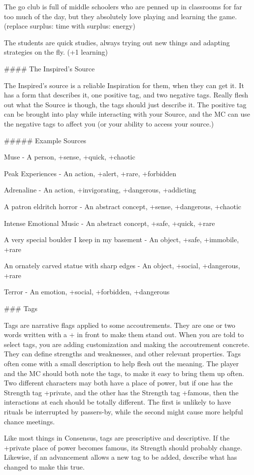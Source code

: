 \documentclass[
  oneside,
  statementpaper,
  9pt]{memoir}
\begin{document}
\begin{Player}
The go club is full of middle schoolers who are penned up in classrooms for far too much of the day, but they absolutely love playing and learning the game. (replace surplus: time with surplus: energy)

The students are quick studies, always trying out new things and adapting strategies on the fly. (+1 learning)

#### The Inspired’s Source

The Inspired’s source is a reliable Inspiration for them, when they can get it. It has a form that describes it, one positive tag, and two negative tags. Really flesh out what the Source is though, the tags should just describe it. The positive tag can be brought into play while interacting with your Source, and the MC can use the negative tags to affect you (or your ability to access your source.)

##### Example Sources

Muse - A person, +sense, +quick, +chaotic

Peak Experiences - An action, +alert, +rare, +forbidden

Adrenaline - An action, +invigorating, +dangerous, +addicting

A patron eldritch horror - An abstract concept, +sense, +dangerous, +chaotic

Intense Emotional Music - An abstract concept, +safe, +quick, +rare

A very special boulder I keep in my basement - An object, +safe, +immobile, +rare

An ornately carved statue with sharp edges - An object, +social, +dangerous, +rare

Terror - An emotion, +social, +forbidden, +dangerous

### Tags

Tags are narrative flags applied to some accoutrements. They are one or two words written with a + in front to make them stand out. When you are told to select tags, you are adding customization and making the accoutrement concrete. They can define strengths and weaknesses, and other relevant properties. Tags often come with a small description to help flesh out the meaning. The player and the MC should both note the tags, to make it easy to bring them up often. Two different characters may both have a place of power, but if one has the Strength tag +private, and the other has the Strength tag +famous, then the interactions at each should be totally different. The first is unlikely to have rituals be interrupted by passers-by, while the second might cause more helpful chance meetings.

Like most things in Consensus, tags are prescriptive and descriptive. If the +private place of power becomes famous, its Strength should probably change. Likewise, if an advancement allows a new tag to be added, describe what has changed to make this true.

\end{Player}
\end{document}
